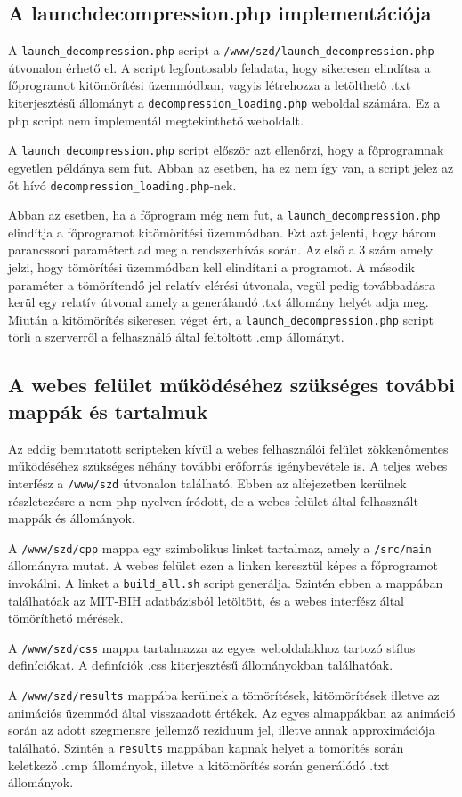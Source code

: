 \documentclass[oneside,titlepage,12pt,a4paper]{report}
\begin{document}
\subsection{A launchdecompression.php implementációja}

A \texttt{launch\_decompression.php} script a \texttt{/www/szd/launch\_decompression.php} útvonalon érhető el. A script legfontosabb feladata, hogy sikeresen elindítsa a főprogramot kitömörítési üzemmódban, vagyis létrehozza a letölthető .txt kiterjesztésű állományt a \texttt{decompression\_loading.php} weboldal számára. Ez a php script nem implementál megtekinthető weboldalt.
\par A \texttt{launch\_decompression.php} script először azt ellenőrzi, hogy a főprogramnak egyetlen példánya sem fut. Abban az esetben, ha ez nem így van, a script jelez az őt hívó \texttt{decompression\_loading.php}-nek. 
\par Abban az esetben, ha a főprogram még nem fut, a \texttt{launch\_decompression.php}  elindítja a főprogramot kitömörítési üzemmódban. Ezt azt jelenti, hogy három parancssori paramétert ad meg a rendszerhívás során. Az első a 3 szám amely jelzi, hogy tömörítési üzemmódban kell elindítani a programot. A második paraméter a tömörítendő jel relatív elérési útvonala, vegül pedig továbbadásra kerül egy relatív útvonal amely a generálandó .txt állomány helyét adja meg. Miután a kitömörítés sikeresen véget ért, a \texttt{launch\_decompression.php} script törli a szerverről a felhasználó által feltöltött .cmp állományt. 

\subsection{A webes felület működéséhez szükséges további mappák és tartalmuk}

Az eddig bemutatott scripteken kívül a webes felhasználói felület zökkenőmentes működéséhez szükséges néhány további erőforrás igénybevétele is. A teljes webes interfész a \texttt{/www/szd} útvonalon található. Ebben az alfejezetben kerülnek részletezésre a nem php nyelven íródott, de a webes felület által felhasznált mappák és állományok.

\par A \texttt{/www/szd/cpp} mappa egy szimbolikus linket tartalmaz, amely a \texttt{/src/main} állományra mutat. A webes felület ezen a linken keresztül képes a főprogramot invokálni. A linket a \texttt{build\_all.sh} script generálja. Szintén ebben a mappában találhatóak az MIT-BIH adatbázisból letöltött, és a webes interfész által tömöríthető mérések. 
\par A \texttt{/www/szd/css} mappa tartalmazza az egyes weboldalakhoz tartozó stílus definíciókat. A definíciók .css kiterjesztésű állományokban találhatóak.
\par A \texttt{/www/szd/results} mappába kerülnek a tömörítések, kitömörítések illetve az animációs üzemmód által visszaadott értékek. Az egyes almappákban az animáció során az adott szegmensre jellemző reziduum jel, illetve annak approximációja található. Szintén a \texttt{results} mappában kapnak helyet a tömörítés során keletkező .cmp állományok, illetve a kitömörítés során generálódó .txt állományok. 
\end{document}
